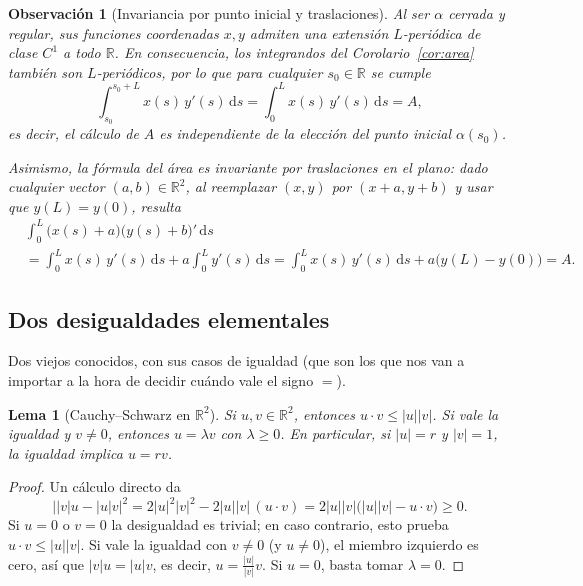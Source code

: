 \documentclass[12pt,a4paper]{article}
\theoremstyle{profesional}
\newtheorem{lemma}[teorema]{Lema}
\theoremstyle{definicion-style}
\newtheorem{observacion}[teorema]{Observación}
\newcommand{\R}{\mathbb{R}}
\newcommand{\abs}[1]{\left| #1 \right|}
\begin{document}
\begin{observacion}[Invariancia por punto inicial y traslaciones]\label{obs:invariancia}
    Al ser \( \alpha \) cerrada y regular, sus funciones coordenadas \( x, y \) admiten una extensión \( L \)-periódica de clase \( C^1 \) a todo \( \R \). En consecuencia, los integrandos del Corolario~\ref{cor:area} también son \( L \)-periódicos, por lo que para cualquier \( s_0 \in \R \) se cumple
    \[
        \int_{s_0}^{s_0 + L} x(s) \, y'(s) \, \mathrm{d}s = \int_0^L x(s) \, y'(s) \, \mathrm{d}s = A,
    \]
    es decir, el cálculo de \( A \) es independiente de la elección del punto inicial \( \alpha(s_0) \).

    Asimismo, la fórmula del área es invariante por traslaciones en el plano: dado cualquier vector \( (a, b) \in \R^2 \), al reemplazar \( (x, y) \) por \( (x + a, y + b) \) y usar que \( y(L) = y(0) \), resulta
    \begin{align*}
         & \int_0^L \big( x(s) + a \big) \big( y(s) + b \big)' \, \mathrm{d}s                                                                                 \\
         & = \int_0^L x(s) \, y'(s) \, \mathrm{d}s + a \int_0^L y'(s) \, \mathrm{d}s = \int_0^L x(s) \, y'(s) \, \mathrm{d}s + a \big( y(L) - y(0) \big) = A.
    \end{align*}
\end{observacion}

\subsection{Dos desigualdades elementales}

Dos viejos conocidos, con sus casos de igualdad (que son los que nos van a importar a la hora de decidir cuándo vale el signo \( = \)).

\begin{lemma}[Cauchy--Schwarz en \( \R^2 \)]\label{lema:cs}
    Si \( u, v \in \R^2 \), entonces \( u \cdot v \leq \abs{u} \abs{v} \). Si vale la igualdad y \( v \neq 0 \), entonces \( u = \lambda v \) con \( \lambda \geq 0 \). En particular, si \( \abs{u} = r \) y \( \abs{v} = 1 \), la igualdad implica \( u = r v \).
\end{lemma}
\begin{proof}
    Un cálculo directo da
    \[
        \big| \abs{v} u - \abs{u} v \big|^2 = 2 \abs{u}^2 \abs{v}^2 - 2 \abs{u} \abs{v} \, (u \cdot v) = 2 \abs{u} \abs{v} \big( \abs{u} \abs{v} - u \cdot v \big) \geq 0.
    \]
    Si \( u = 0 \) o \( v = 0 \) la desigualdad es trivial; en caso contrario, esto prueba \( u \cdot v \leq \abs{u} \abs{v} \). Si vale la igualdad con \( v \neq 0 \) (y \( u \neq 0 \)), el miembro izquierdo es cero, así que \( \abs{v} u = \abs{u} v \), es decir, \( u = \frac{\abs{u}}{\abs{v}} v \). Si \( u = 0 \), basta tomar \( \lambda = 0 \).
\end{proof}
\end{document}
